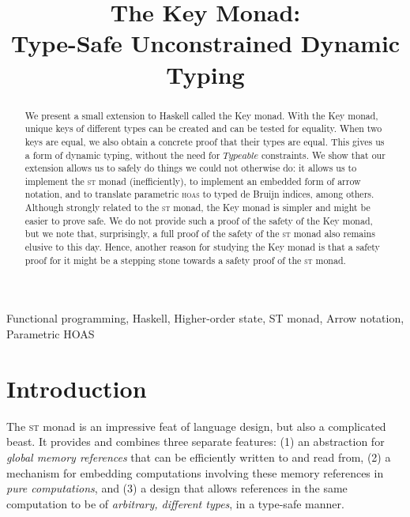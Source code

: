 \documentclass{sigplanconf}
\title{The Key Monad:\\Type-Safe Unconstrained Dynamic Typing}
\newcommand{\Conid}[1]{\mathit{#1}}
\begin{document}
\toappear{}
\maketitle
\newcommand{\api}{\textsc{api}}
\newcommand{\gadt}{\textsc{gadt}}
\newcommand{\ghc}{\textsc{ghc}}
\newcommand{\hoas}{\textsc{hoas}}
\newcommand{\st}{\textsc{st}}
\newcommand{\atze}[1]{{\it Atze says: #1}}
\newcommand{\koen}[1]{{\it Koen says: #1}}
\newcommand{\pablo}[1]{{\it Pablo says: #1}}


\begin{abstract}
 We present a small extension to Haskell called the
  Key monad. With the Key monad, unique keys of different types can be
  created and can be tested for equality. When two keys are equal, we
  also obtain a concrete proof that their types are equal. This gives us a form of
  dynamic typing, without the need for \ensuremath{\Conid{Typeable}} constraints. We
  show that our extension allows us to safely do things we could not
  otherwise do: it allows us to implement the \st{} monad (inefficiently), to implement an
  embedded form of arrow notation, and to translate
  parametric \hoas{} to typed de Bruijn indices, among others. Although strongly
  related to the \st{} monad, the Key monad is simpler and might be 
  easier to prove safe. We do not provide such a proof of the safety of the Key monad, but we note that, surprisingly, a full proof of the safety of
  the \st{} monad also remains elusive to this day. Hence, another reason for
  studying the Key monad is that a safety proof for it might
  be a stepping stone towards a safety proof of the \st{} monad.
\end{abstract}


\keywords
Functional programming, Haskell, Higher-order state, ST monad, Arrow notation, Parametric HOAS

\section{Introduction}

The \st{} monad \cite{stmonad} is an impressive feat of language design, but also a complicated beast. It provides and combines three separate features: (1) an abstraction for {\em global memory references} that can be efficiently written to and read from, (2) a mechanism for embedding computations involving these memory references in {\em pure computations}, and (3) a design that allows references in the same computation to be of {\em arbitrary, different types}, in a type-safe manner.
\end{document}
